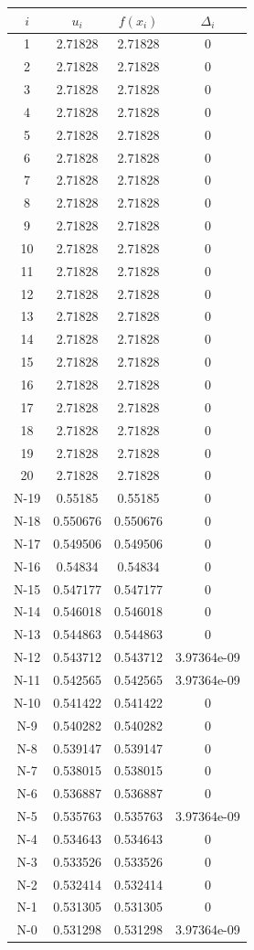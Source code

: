 \documentclass[10pt,a4paper,oneside,russian]{article}
\begin{document}
  \begin{tabular}{|c|c|c|c|}
    \hline
    $i$ & $u_i$ & $f(x_i)$ & $\Delta_i$\\ \hline
    1&2.71828&2.71828&0\\ \hline
2&2.71828&2.71828&0\\ \hline
3&2.71828&2.71828&0\\ \hline
4&2.71828&2.71828&0\\ \hline
5&2.71828&2.71828&0\\ \hline
6&2.71828&2.71828&0\\ \hline
7&2.71828&2.71828&0\\ \hline
8&2.71828&2.71828&0\\ \hline
9&2.71828&2.71828&0\\ \hline
10&2.71828&2.71828&0\\ \hline
11&2.71828&2.71828&0\\ \hline
12&2.71828&2.71828&0\\ \hline
13&2.71828&2.71828&0\\ \hline
14&2.71828&2.71828&0\\ \hline
15&2.71828&2.71828&0\\ \hline
16&2.71828&2.71828&0\\ \hline
17&2.71828&2.71828&0\\ \hline
18&2.71828&2.71828&0\\ \hline
19&2.71828&2.71828&0\\ \hline
20&2.71828&2.71828&0\\ \hline
N-19&0.55185&0.55185&0\\ \hline
N-18&0.550676&0.550676&0\\ \hline
N-17&0.549506&0.549506&0\\ \hline
N-16&0.54834&0.54834&0\\ \hline
N-15&0.547177&0.547177&0\\ \hline
N-14&0.546018&0.546018&0\\ \hline
N-13&0.544863&0.544863&0\\ \hline
N-12&0.543712&0.543712&3.97364e-09\\ \hline
N-11&0.542565&0.542565&3.97364e-09\\ \hline
N-10&0.541422&0.541422&0\\ \hline
N-9&0.540282&0.540282&0\\ \hline
N-8&0.539147&0.539147&0\\ \hline
N-7&0.538015&0.538015&0\\ \hline
N-6&0.536887&0.536887&0\\ \hline
N-5&0.535763&0.535763&3.97364e-09\\ \hline
N-4&0.534643&0.534643&0\\ \hline
N-3&0.533526&0.533526&0\\ \hline
N-2&0.532414&0.532414&0\\ \hline
N-1&0.531305&0.531305&0\\ \hline
N-0&0.531298&0.531298&3.97364e-09\\ \hline

  \end{tabular}
\end{document}
